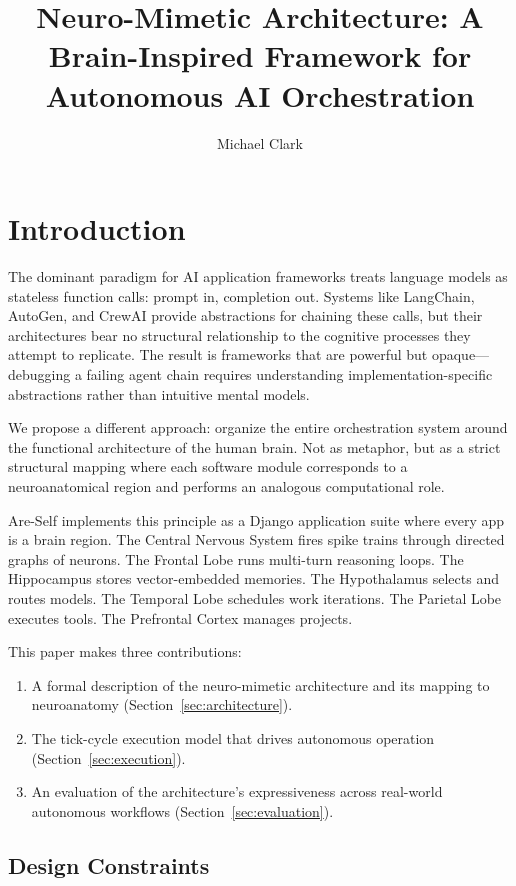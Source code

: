 \documentclass[man,12pt,floatsintext]{apa7}
\title{Neuro-Mimetic Architecture: A Brain-Inspired Framework for Autonomous AI Orchestration}
\author{Michael Clark}
\affiliation{Independent Researcher \\ scipraxian}
\begin{document}
\maketitle

\section{Introduction}

The dominant paradigm for AI application frameworks treats language models as stateless
function calls: prompt in, completion out. Systems like LangChain, AutoGen, and CrewAI
provide abstractions for chaining these calls, but their architectures bear no structural
relationship to the cognitive processes they attempt to replicate. The result is frameworks
that are powerful but opaque---debugging a failing agent chain requires understanding
implementation-specific abstractions rather than intuitive mental models.

We propose a different approach: organize the entire orchestration system around the
functional architecture of the human brain. Not as metaphor, but as a strict structural
mapping where each software module corresponds to a neuroanatomical region and performs
an analogous computational role.

Are-Self implements this principle as a Django application suite where every app is a
brain region. The Central Nervous System fires spike trains through directed graphs of
neurons. The Frontal Lobe runs multi-turn reasoning loops. The Hippocampus stores
vector-embedded memories. The Hypothalamus selects and routes models. The Temporal Lobe
schedules work iterations. The Parietal Lobe executes tools. The Prefrontal Cortex
manages projects.

This paper makes three contributions:

\begin{enumerate}
  \item A formal description of the neuro-mimetic architecture and its mapping to
        neuroanatomy (Section~\ref{sec:architecture}).
  \item The tick-cycle execution model that drives autonomous operation
        (Section~\ref{sec:execution}).
  \item An evaluation of the architecture's expressiveness across real-world autonomous
        workflows (Section~\ref{sec:evaluation}).
\end{enumerate}

\subsection{Design Constraints}
\end{document}
